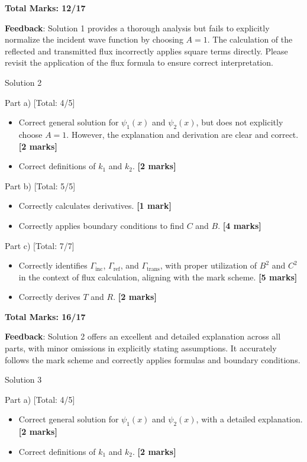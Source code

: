 \documentclass[a4paper,11pt]{article}
\begin{document}
\textbf{Total Marks: 12/17}

\textbf{Feedback}: Solution 1 provides a thorough analysis but fails to explicitly normalize the incident wave function by choosing \(A = 1\). The calculation of the reflected and transmitted flux incorrectly applies square terms directly. Please revisit the application of the flux formula to ensure correct interpretation.

Solution 2

Part a) [Total: 4/5]

\begin{itemize}
    \item Correct general solution for \(\psi_1(x)\) and \(\psi_2(x)\), but does not explicitly choose \(A = 1\). However, the explanation and derivation are clear and correct. \textbf{[2 marks]}
    \item Correct definitions of \(k_1\) and \(k_2\). \textbf{[2 marks]}
\end{itemize}

Part b) [Total: 5/5]

\begin{itemize}
    \item Correctly calculates derivatives. \textbf{[1 mark]}
    \item Correctly applies boundary conditions to find \(C\) and \(B\). \textbf{[4 marks]}
\end{itemize}

Part c) [Total: 7/7]

\begin{itemize}
    \item Correctly identifies \(\Gamma_{\text{inc}}\), \(\Gamma_{\text{ref}}\), and \(\Gamma_{\text{trans}}\), with proper utilization of \(B^2\) and \(C^2\) in the context of flux calculation, aligning with the mark scheme. \textbf{[5 marks]}
    \item Correctly derives \(T\) and \(R\). \textbf{[2 marks]}
\end{itemize}

\textbf{Total Marks: 16/17}

\textbf{Feedback}: Solution 2 offers an excellent and detailed explanation across all parts, with minor omissions in explicitly stating assumptions. It accurately follows the mark scheme and correctly applies formulas and boundary conditions.

Solution 3

Part a) [Total: 4/5]

\begin{itemize}
    \item Correct general solution for \(\psi_1(x)\) and \(\psi_2(x)\), with a detailed explanation. \textbf{[2 marks]}
    \item Correct definitions of \(k_1\) and \(k_2\). \textbf{[2 marks]}
\end{itemize}
\end{document}
